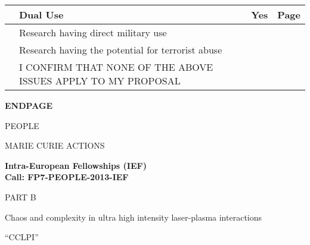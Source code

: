 \documentclass[a4paper,11pt]{article}
\newcommand{\projectname}[0]{CCLPI}
\newcommand{\mytitle}{Chaos and complexity in ultra high intensity laser-plasma interactions}
\newcommand{\cover}[1]{%
\newpage
\begin{center}
\vspace{4cm}
\textbf{#1}
\vspace{4cm}

PEOPLE

MARIE CURIE ACTIONS

\vspace{1cm}

\textbf{Intra-European Fellowships (IEF)}\\
\textbf{Call: FP7-PEOPLE-2013-IEF}

\vspace{4cm}

\Large{PART B}
\vspace{2cm}

\Huge{\mytitle}

\vspace{1cm}

\Large{``\projectname''}

\end{center}
\newpage
}
\begin{document}
\vspace{0.5cm}
\begin{tabularx}{\linewidth}{ | c | X | c | c | }
\rowcolor{black} & {\centering\arraybackslash \color{white} \bf Dual Use} & {\color{white} \bf Yes} & {\color{white} \bf Page} \\ \hline
   & Research having direct military use                          & & \\ \hline
   & Research having the potential for terrorist abuse            & & \\ \hline
   & I CONFIRM THAT NONE OF THE ABOVE ISSUES APPLY TO MY PROPOSAL & & \cellcolor[gray]{0.8}\\ \hline
\end{tabularx}



\cover{ENDPAGE}
\end{document}
